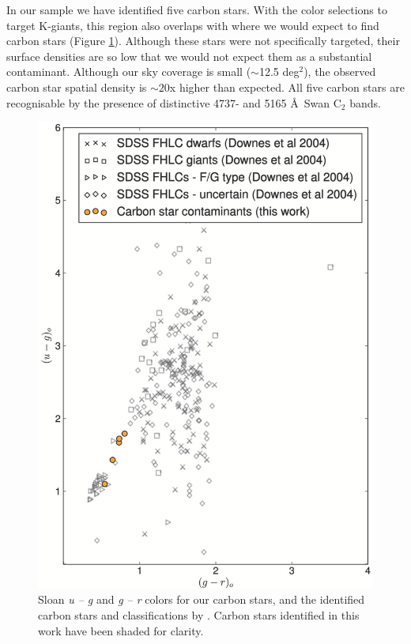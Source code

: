 \documentclass[preprint2]{aastex}
\begin{document}
	In our sample we have identified five carbon stars. With the color selections to target K-giants, this region also overlaps with where we would expect to find carbon stars (Figure \ref{fig:carbon-sdss}). Although these stars were not specifically targeted, their surface densities are so low \citep[$\approx$ 1 per 50 deg$^2$;][]{Green;et-al_1994} that we would not expect them as a substantial contaminant.  Although our sky coverage is small ($\sim$12.5 deg$^2$), the observed carbon star spatial density is $\sim20$x higher than expected. All five carbon stars are recognisable by the presence of distinctive 4737- and 5165 \AA\, Swan C$_2$ bands.


\begin{figure}[h!]
	\includegraphics[width=\columnwidth]{./carbon_stars.eps}
	\caption{Sloan \textit{u \--- g} and \textit{g \--- r} colors for our carbon stars, and the identified carbon stars and classifications by \citet{Downes;et-al_2004}. Carbon stars identified in this work have been shaded for clarity.}
	\label{fig:carbon-sdss}
\end{figure}
\end{document}
